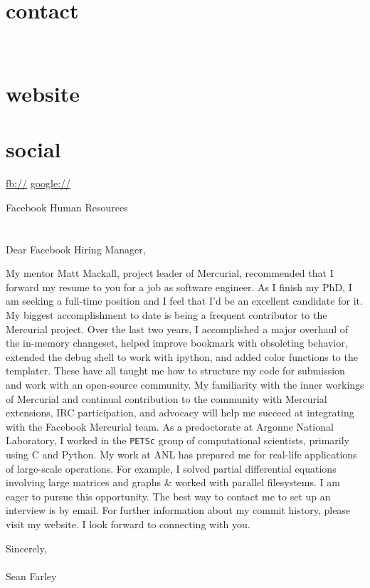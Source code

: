 \documentclass[]{fancy-cv}
\begin{document}

\begin{aside}
  \section{contact}
    \href{mailto:\myemail}{\myemail}
    ~
    \myphone
    ~
    \myaddress
    \mycity
  \section{website}
    \href{\mywebsite}{\mywebsite}
  \section{social}
    \href{http://facebook.com/\myfb}{fb://\myfb}
    \href{http://plug.google.com/\mygp}{google://\mygp}
\end{aside}

\vspace{.8em}
\large
Facebook Human Resources\\
\\
\\
Dear Facebook Hiring Manager,

My mentor Matt Mackall, project leader of Mercurial, recommended that I forward
my resume to you for a job as software engineer. As I finish my PhD, I am
seeking a full-time position and I feel that I'd be an excellent candidate for
it.
%
\newline\newline
%
My biggest accomplishment to date is being a frequent contributor to the
Mercurial project. Over the last two years, I accomplished a major overhaul of
the in-memory changeset, helped improve bookmark with obsoleting behavior,
extended the debug shell to work with ipython, and added color functions to the
templater. These have all taught me how to structure my code for submission and
work with an open-source community. My familiarity with the inner workings of
Mercurial and continual contribution to the community with Mercurial
extensions, IRC participation, and advocacy will help me succeed at integrating
with the Facebook Mercurial team.
%
\newline\newline
%
As a predoctorate at Argonne National Laboratory, I worked in the
\texttt{PETSc} group of computational scientists, primarily using C and
Python. My work at ANL has prepared me for real-life applications of
large-scale operations. For example, I solved partial differential equations
involving large matrices and graphs \& worked with parallel filesystems.
%
\newline\newline
%
I am eager to pursue this opportunity. The best way to contact me to set up an
interview is by email. For further information about my commit history, please
visit my website. I look forward to connecting with you.

\vspace{2em}
Sincerely,\\
\\
Sean Farley
\end{document}
